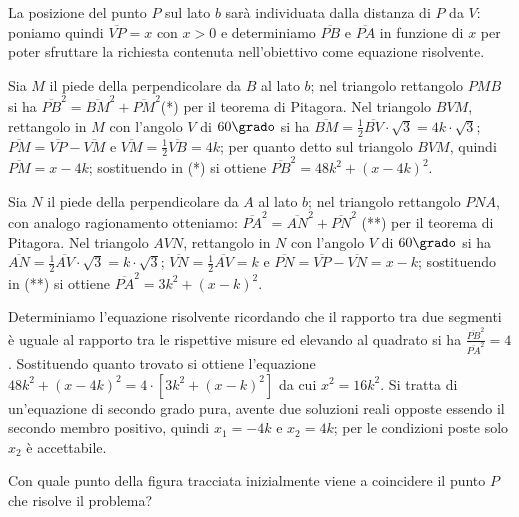 \begin{soluzione}
La posizione del punto $ P $ sul lato $ b $ sarà individuata dalla distanza di $ P $ da $ V $: poniamo quindi $\overline {VP} = x$ con $x > 0$ e determiniamo
$\overline {PB}$ e $\overline {PA}$ in funzione di $ x $ per poter sfruttare la richiesta contenuta nell’obiettivo come equazione risolvente.

Sia $ M $ il piede della perpendicolare da $ B $ al lato $ b $; nel triangolo rettangolo $ PMB $ si ha $\overline {PB}^{2} = \overline {BM}^{2} + \overline {PM}^{2}$(*) per il teorema di Pitagora. Nel triangolo $ BVM $, rettangolo in $ M $ con l’angolo $ V $ di $ 60\grado $ si ha $\overline {BM} = \frac{1}{2} \overline {BV} \cdot \sqrt{3} = 4 k\cdot \sqrt{3}$; $\overline {PM} = \overline {VP} - \overline {VM}$ e $\overline {VM} = \frac{1}{2} \overline {VB} = 4 k$; per quanto detto sul triangolo $ BVM $, quindi $\overline {PM} = x - 4 k$; sostituendo in (*) si ottiene $\overline {PB}^{2} = 48 k^{2} + ( x - 4 k )^{2}$.

Sia $ N $ il piede della perpendicolare da $ A $ al lato $ b $; nel triangolo rettangolo $ PNA $, con analogo ragionamento otteniamo: $\overline {PA}^{2} = \overline {AN}^{2} + \overline {PN}^{2}$ (**) per il teorema di Pitagora. Nel triangolo $ AVN $, rettangolo in $ N $ con l’angolo $ V $ di $ 60\grado $ si ha
$\overline {AN} = \frac{1}{2} \overline {AV} \cdot \sqrt{3} = k \cdot \sqrt{3}$; $ \overline {VN} = \frac{1}{2} \overline {AV} = k$ e $\overline {PN} = \overline {VP} - \overline {VN} = x - k$; sostituendo in (**) si ottiene $\overline {PA}^{2} = 3 k^{2} + ( x - k )^{2}$.

Determiniamo l’equazione risolvente ricordando che il rapporto tra due segmenti è uguale al rapporto tra le rispettive misure ed elevando al quadrato
si ha $\frac{\overline {PB}^{2}}{\overline {PA}^{2}} = 4$. Sostituendo quanto trovato si ottiene l’equazione $48 k^{2} + ( x - 4 k )^{2} = 4 \cdot \left[ 3 k^{2} + ( x - k )^{2} \right]$ da cui $x^{2} = 16 k^{2}$. Si tratta di un'equazione di secondo grado pura, avente due soluzioni reali opposte essendo il secondo membro positivo, quindi $x_{1} = - 4 k$ e $x_2=4 k$; per le condizioni poste solo $ x_2 $ è accettabile.

Con quale punto della figura tracciata inizialmente viene a coincidere il punto $ P $ che risolve il problema?
\end{soluzione}
\vspazio{}

\begin{comment}

\end{comment}
\newpage

\cleardoublepage

